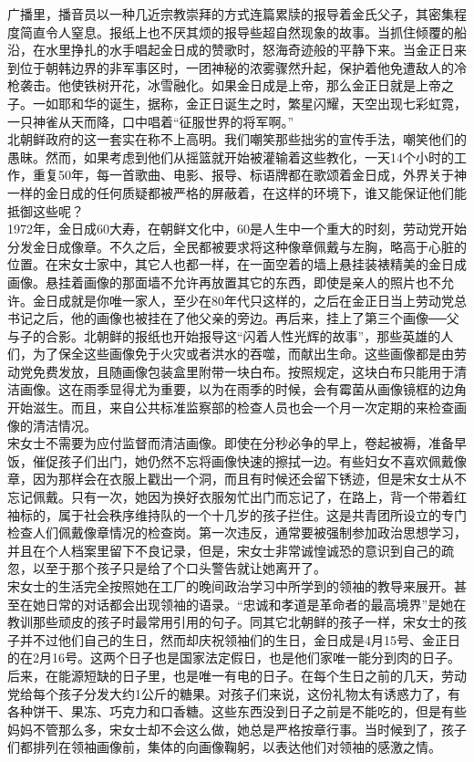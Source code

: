 \begin{multicols}{\theparacolNo}
广播里，播音员以一种几近宗教崇拜的方式连篇累牍的报导着金氏父子，其密集程度简直令人窒息。报纸上也不厌其烦的报导些超自然现象的故事。当抓住倾覆的船沿，在水里挣扎的水手唱起金日成的赞歌时，怒海奇迹般的平静下来。当金正日来到位于朝韩边界的非军事区时，一团神秘的浓雾骤然升起，保护着他免遭敌人的冷枪袭击。他使铁树开花，冰雪融化。如果金日成是上帝，那么金正日就是上帝之子。一如耶和华的诞生，据称，金正日诞生之时，繁星闪耀，天空出现七彩虹霓，一只神雀从天而降，口中唱着“征服世界的将军啊。”\\

北朝鲜政府的这一套实在称不上高明。我们嘲笑那些拙劣的宣传手法，嘲笑他们的愚昧。然而，如果考虑到他们从摇篮就开始被灌输着这些教化，一天14个小时的工作，重复50年，每一首歌曲、电影、报导、标语牌都在歌颂着金日成，外界关于神一样的金日成的任何质疑都被严格的屏蔽着，在这样的环境下，谁又能保证他们能抵御这些呢？\\

1972年，金日成60大寿，在朝鲜文化中，60是人生中一个重大的时刻，劳动党开始分发金日成像章。不久之后，全民都被要求将这种像章佩戴与左胸，略高于心脏的位置。在宋女士家中，其它人也都一样，在一面空着的墙上悬挂装裱精美的金日成画像。悬挂着画像的那面墙不允许再放置其它的东西，即使是亲人的照片也不允许。金日成就是你唯一家人，至少在80年代只这样的，之后在金正日当上劳动党总书记之后，他的画像也被挂在了他父亲的旁边。再后来，挂上了第三个画像──父与子的合影。北朝鲜的报纸也开始报导这“闪着人性光辉的故事”，那些英雄的人们，为了保全这些画像免于火灾或者洪水的吞噬，而献出生命。这些画像都是由劳动党免费发放，且随画像包装盒里附带一块白布。按照规定，这块白布只能用于清洁画像。这在雨季显得尤为重要，以为在雨季的时候，会有霉菌从画像镜框的边角开始滋生。而且，来自公共标准监察部的检查人员也会一个月一次定期的来检查画像的清洁情况。\\

宋女士不需要为应付监督而清洁画像。即使在分秒必争的早上，卷起被褥，准备早饭，催促孩子们出门，她仍然不忘将画像快速的擦拭一边。有些妇女不喜欢佩戴像章，因为那样会在衣服上戳出一个洞，而且有时候还会留下锈迹，但是宋女士从不忘记佩戴。只有一次，她因为换好衣服匆忙出门而忘记了，在路上，背一个带着红袖标的，属于社会秩序维持队的一个十几岁的孩子拦住。这是共青团所设立的专门检查人们佩戴像章情况的检查岗。第一次违反，通常要被强制参加政治思想学习，并且在个人档案里留下不良记录，但是，宋女士非常诚惶诚恐的意识到自己的疏忽，以至于那个孩子只是给了个口头警告就让她离开了。\\

宋女士的生活完全按照她在工厂的晚间政治学习中所学到的领袖的教导来展开。甚至在她日常的对话都会出现领袖的语录。“忠诚和孝道是革命者的最高境界”是她在教训那些顽皮的孩子时最常用引用的句子。同其它北朝鲜的孩子一样，宋女士的孩子并不过他们自己的生日，然而却庆祝领袖们的生日，金日成是4月15号、金正日的在2月16号。这两个日子也是国家法定假日，也是他们家唯一能分到肉的日子。后来，在能源短缺的日子里，也是唯一有电的日子。在每个生日之前的几天，劳动党给每个孩子分发大约1公斤的糖果。对孩子们来说，这份礼物太有诱惑力了，有各种饼干、果冻、巧克力和口香糖。这些东西没到日子之前是不能吃的，但是有些妈妈不管那么多，宋女士却不会这么做，她总是严格按章行事。当时候到了，孩子们都排列在领袖画像前，集体的向画像鞠躬，以表达他们对领袖的感激之情。\\


\end{multicols}
